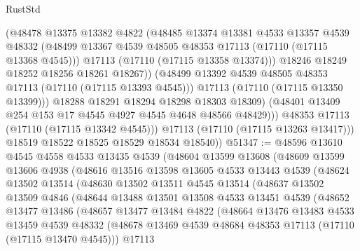 \begin{lexlean}{RustStd}
\begin{coremodule}
                      (@48478
                        @13375
                        @13382
                        @4822
                        (@48485
                          @13374
                          @13381
                          @4533
                          @13357
                          @4539
                          @48332
                          (@48499 @13367 @4539 @48505 @48353 @17113 (@17110 (@17115 @13368 @4545)))
                          @17113
                          (@17110 (@17115 @13358 @13374)))
                        @18246
                        @18249
                        @18252
                        @18256
                        @18261
                        @18267))
                    (@48499 @13392 @4539 @48505 @48353 @17113 (@17110 (@17115 @13393 @4545)))
                    @17113
                    (@17110 (@17115 @13350 @13399)))
                  @18288
                  @18291
                  @18294
                  @18298
                  @18303
                  @18309)
                (@48401 @13409 @254 @153 @17 @4545 @4927 @4545 @4648 @48566 @48429)))
            @48353
            @17113
            (@17110 (@17115 @13342 @4545)))
          @17113
          (@17110 (@17115 @13263 @13417)))
        @18519
        @18522
        @18525
        @18529
        @18534
        @18540))
@51347 := @48596
    @13610
    @4545
    @4558
    @4533
    @13435
    @4539
    (@48604
      @13599
      @13608
      (@48609
        @13599
        @13606
        @4938
        (@48616
          @13516
          @13598
          @13605
          @4533
          @13443
          @4539
          (@48624
            @13502
            @13514
            (@48630
              @13502
              @13511
              @4545
              @13514
              (@48637
                @13502
                @13509
                @4846
                (@48644
                  @13488
                  @13501
                  @13508
                  @4533
                  @13451
                  @4539
                  (@48652
                    @13477
                    @13486
                    (@48657
                      @13477
                      @13484
                      @4822
                      (@48664
                        @13476
                        @13483
                        @4533
                        @13459
                        @4539
                        @48332
                        (@48678 @13469 @4539 @48684 @48353 @17113 (@17110 (@17115 @13470 @4545)))
                        @17113

\end{coremodule}
\end{lexlean}
